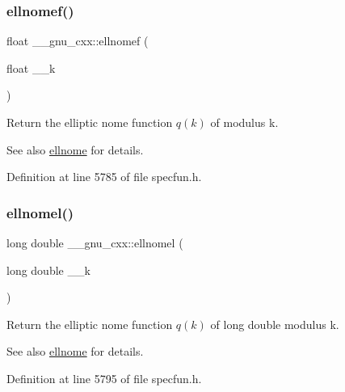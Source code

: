 \subsubsection{\texorpdfstring{ellnomef()}{ellnomef()}}
{\footnotesize\ttfamily float \+\_\+\+\_\+gnu\+\_\+cxx\+::ellnomef (\begin{DoxyParamCaption}\item[{float}]{\+\_\+\+\_\+k }\end{DoxyParamCaption})\hspace{0.3cm}{\ttfamily [inline]}}

Return the elliptic nome function $ q(k) $ of modulus {\ttfamily k}.

\begin{DoxySeeAlso}{See also}
\hyperlink{group__mathsf__gnu_ga7bfb34f8b5c0ed7c72040f9cb7034bba}{ellnome} for details. 
\end{DoxySeeAlso}


Definition at line 5785 of file specfun.\+h.

\mbox{\label{group__mathsf__gnu_ga0774570b24f654f8ae39e1865613a4e2}} 
\subsubsection{\texorpdfstring{ellnomel()}{ellnomel()}}
{\footnotesize\ttfamily long double \+\_\+\+\_\+gnu\+\_\+cxx\+::ellnomel (\begin{DoxyParamCaption}\item[{long double}]{\+\_\+\+\_\+k }\end{DoxyParamCaption})\hspace{0.3cm}{\ttfamily [inline]}}

Return the elliptic nome function $ q(k) $ of {\ttfamily long double} modulus {\ttfamily k}.

\begin{DoxySeeAlso}{See also}
\hyperlink{group__mathsf__gnu_ga7bfb34f8b5c0ed7c72040f9cb7034bba}{ellnome} for details. 
\end{DoxySeeAlso}


Definition at line 5795 of file specfun.\+h.

\mbox{\label{group__mathsf__gnu_gac956e6457ab7d0d1765d281e73073f55}} 
